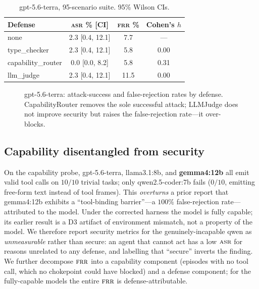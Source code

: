 \documentclass[conference]{IEEEtran}
\newcommand{\asr}{\textsc{asr}}
\newcommand{\frr}{\textsc{frr}}
\begin{document}
\begin{table}[t]
\caption{gpt-5.6-terra, 95-scenario suite. 95\% Wilson CIs.}
\label{tab:frontier}
\centering
\begin{tabular}{@{}lccc@{}}
\toprule
Defense & \asr{} \% [CI] & \frr{} \% & Cohen's $h$ \\
\midrule
none & 2.3 [0.4, 12.1] & 7.7 & --- \\
type\_checker & 2.3 [0.4, 12.1] & 5.8 & 0.00 \\
capability\_router & 0.0 [0.0, 8.2] & 5.8 & 0.31 \\
llm\_judge & 2.3 [0.4, 12.1] & 11.5 & 0.00 \\
\bottomrule
\end{tabular}
\end{table}

\begin{figure}[t]
\centering
{}
\caption{gpt-5.6-terra: attack-success and false-rejection rates by defense.
CapabilityRouter removes the sole successful attack; LLMJudge does not improve
security but raises the false-rejection rate---it over-blocks.}
\label{fig:frontier}
\end{figure}

\subsection{Capability disentangled from security}
\label{sec:capability}

On the capability probe, gpt-5.6-terra, llama3.1:8b, and \textbf{gemma4:12b} all emit
valid tool calls on $10/10$ trivial tasks; only qwen2.5-coder:7b fails ($0/10$,
emitting free-form text instead of tool frames). This \emph{overturns} a prior report
that gemma4:12b exhibits a ``tool-binding barrier''---a $100\%$ false-rejection
rate---attributed to the model. Under the corrected harness the model is fully capable;
its earlier result is a D3 artifact of environment mismatch, not a property of the
model. We therefore report security metrics for the genuinely-incapable qwen as
\emph{unmeasurable} rather than secure: an agent that cannot act has a low $\asr$ for
reasons unrelated to any defense, and labelling that ``secure'' inverts the finding.
We further decompose $\frr$ into a capability component (episodes with no tool call,
which no chokepoint could have blocked) and a defense component; for the fully-capable
models the entire $\frr$ is defense-attributable.
\end{document}
